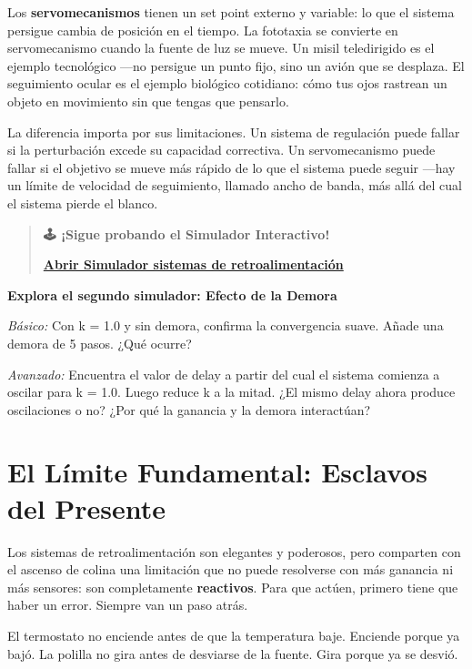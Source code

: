 \documentclass[
  letterpaper,
  DIV=11,
  numbers=noendperiod]{scrreprt}
\begin{document}
\begin{tcolorbox}[enhanced jigsaw, toprule=.15mm, arc=.35mm, colback=white, opacityback=0, colframe=quarto-callout-note-color-frame, breakable, rightrule=.15mm, left=2mm, leftrule=.75mm, bottomrule=.15mm]
Los \textbf{servomecanismos} tienen un set point externo y variable: lo
que el sistema persigue cambia de posición en el tiempo. La fototaxia se
convierte en servomecanismo cuando la fuente de luz se mueve. Un misil
teledirigido es el ejemplo tecnológico ---no persigue un punto fijo,
sino un avión que se desplaza. El seguimiento ocular es el ejemplo
biológico cotidiano: cómo tus ojos rastrean un objeto en movimiento sin
que tengas que pensarlo.

La diferencia importa por sus limitaciones. Un sistema de regulación
puede fallar si la perturbación excede su capacidad correctiva. Un
servomecanismo puede fallar si el objetivo se mueve más rápido de lo que
el sistema puede seguir ---hay un límite de velocidad de seguimiento,
llamado ancho de banda, más allá del cual el sistema pierde el blanco.

\begin{quote}
\textbf{🕹️ ¡Sigue probando el Simulador Interactivo!}

\href{https://colab.research.google.com/github/arbouria/Libro-ACA-2026/blob/main/Simuladores/retroalimentacion.ipynb}{\textbf{Abrir
Simulador sistemas de retroalimentación}}
\end{quote}

\textbf{Explora el segundo simulador: Efecto de la Demora}

\emph{Básico:} Con k = 1.0 y sin demora, confirma la convergencia suave.
Añade una demora de 5 pasos. ¿Qué ocurre?

\emph{Avanzado:} Encuentra el valor de delay a partir del cual el
sistema comienza a oscilar para k = 1.0. Luego reduce k a la mitad. ¿El
mismo delay ahora produce oscilaciones o no? ¿Por qué la ganancia y la
demora interactúan?

\section{El Límite Fundamental: Esclavos del
Presente}\label{el-luxedmite-fundamental-esclavos-del-presente}

Los sistemas de retroalimentación son elegantes y poderosos, pero
comparten con el ascenso de colina una limitación que no puede
resolverse con más ganancia ni más sensores: son completamente
\textbf{reactivos}. Para que actúen, primero tiene que haber un error.
Siempre van un paso atrás.

El termostato no enciende antes de que la temperatura baje. Enciende
porque ya bajó. La polilla no gira antes de desviarse de la fuente. Gira
porque ya se desvió.


\end{tcolorbox}
\end{document}

